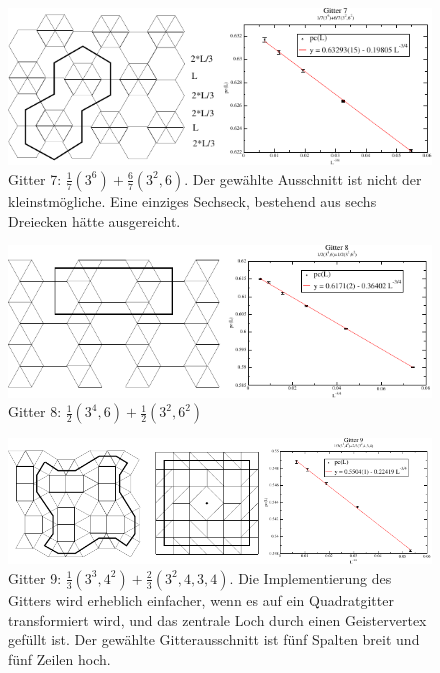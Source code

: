 \begin{figure}[p]
  \includegraphics{./Numerik-figs/2-uni-7_fig}
  \caption{Gitter 7: $\frac{1}{7}(3^6)+\frac{6}{7}(3^2,6)$. Der gew\"ahlte Ausschnitt ist nicht der kleinstm\"ogliche. Eine einziges Sechseck, bestehend aus sechs Dreiecken h\"atte ausgereicht.}
\end{figure}
\clearpage
\begin{figure}[p]
  \includegraphics{./Numerik-figs/2-uni-8_fig}
  \caption{Gitter 8:  $\frac{1}{2}(3^4,6)+\frac{1}{2}(3^2,6^2)$}
\end{figure}
\begin{figure}[p]
  \includegraphics{./Numerik-figs/2-uni-9_fig}
  \caption{Gitter 9: $\frac{1}{3}(3^3,4^2)+\frac{2}{3}(3^2,4,3,4)$. Die Implementierung des Gitters wird erheblich einfacher, wenn es auf ein Quadratgitter transformiert wird, und das zentrale Loch durch einen Geistervertex gef\"ullt ist. Der gew\"ahlte Gitterausschnitt ist f\"unf Spalten breit und f\"unf Zeilen hoch. }
\label{fig:appgitter9}
\end{figure}
